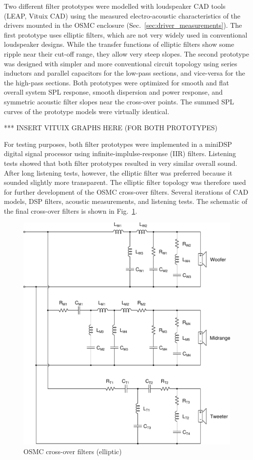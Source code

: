 \documentclass[12pt,a4paper]{article}
\providecommand{\figr}[1]{Fig.~\ref{fig:#1}}
\providecommand{\figlabel}[1]{\label{fig:#1}}
\providecommand{\sectn}[1]{Sec.~\ref{sec:#1}}
\begin{document}
Two different filter prototypes\cite{osmc_p685} were modelled with loudspeaker CAD tools (LEAP, Vituix CAD) using the measured electro-acoustic characteristics of the drivers mounted in the OSMC enclosure (\sectn{driver_measurements}). The first prototype uses elliptic filters, which are not very widely used in conventional loudspeaker designs. While the transfer functions of elliptic filters show some ripple near their cut-off range, they allow very steep slopes. The second prototype was designed with simpler and more conventional circuit topology using series inductors and parallel capacitors for the low-pass sections, and vice-versa for the the high-pass sections. Both prototypes were optimized for smooth and flat overall system SPL response, smooth dispersion and power response, and symmetric acoustic filter slopes near the cross-over points. The summed SPL curves of the prototype models were virtually identical.

*** INSERT VITUIX GRAPHS HERE (FOR BOTH PROTOTYPES)

For testing purposes, both filter prototypes were implemented in a miniDSP digital signal processor using infinite-implulse-response (IIR) filters. Listening tests showed that both filter prototypes resulted in very similar overall sound. After long listening tests, however, the elliptic filter was preferred because it sounded slightly more transparent\cite{osmc_p708}. The elliptic filter topology was therefore used for further development of the OSMC cross-over filters. Several iterations of CAD models, DSP filters, acoustic measurements, and listening tests. The schematic of the final cross-over filters is shown in \figr{OSMC_EL_xover_schem}.

\begin{figure}[p]
	\centering
	\includegraphics[width=\textwidth]{EL34_20190303.pdf}
	\caption{OSMC cross-over filters (elliptic)}
	\figlabel{OSMC_EL_xover_schem}
\end{figure}
\end{document}
